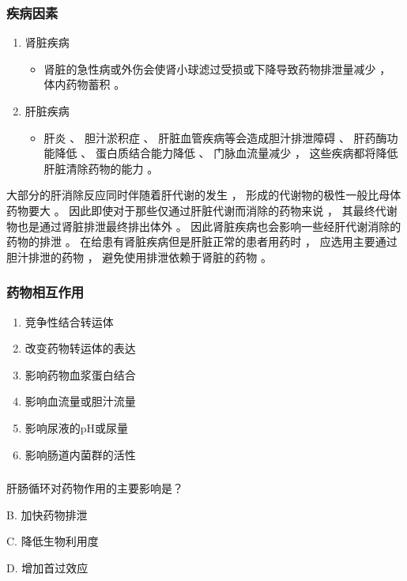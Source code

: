\documentclass[dvipsnames, svgnames, x11names]{beamer}
\begin{document}
\begin{frame}
    \frametitle{疾病因素}
    \begin{enumerate}
      \item 肾脏疾病
        \begin{itemize}
          \item 肾脏的急性病或外伤会使肾小球滤过受损或下降导致药物排泄量减少 ， 体内药物蓄积 。
        \end{itemize}
      \item 肝脏疾病
        \begin{itemize}
          \item 肝炎 、 胆汁淤积症 、 肝脏血管疾病等会造成胆汁排泄障碍 、 肝药酶功能降低 、 蛋白质结合能力降低 、 门脉血流量减少 ， 这些疾病都将降低肝脏清除药物的能力 。
        \end{itemize}
    \end{enumerate}
    \begin{blankblock}{}
        大部分的肝消除反应同时伴随着肝代谢的发生 ， 形成的代谢物的极性一般比母体药物要大 。 因此即使对于那些仅通过肝脏代谢而消除的药物来说 ， 其最终代谢物也是通过肾脏排泄最终排出体外 。 因此肾脏疾病也会影响一些经肝代谢消除的药物的排泄 。 在给患有肾脏疾病但是肝脏正常的患者用药时 ， 应选用主要通过胆汁排泄的药物 ， 避免使用排泄依赖于肾脏的药物 。
    \end{blankblock}
\end{frame}


\begin{frame}
    \frametitle{药物相互作用}
    \begin{enumerate}
      \item 竞争性结合转运体
      \item 改变药物转运体的表达
      \item 影响药物血浆蛋白结合
      \item 影响血流量或胆汁流量
      \item 影响尿液的pH或尿量
      \item 影响肠道内菌群的活性
    \end{enumerate}
\end{frame}


\begin{frame}[t]
    \frametitle{}
    \begin{question}
        肝肠循环对药物作用的主要影响是？
        \tcblower


        B. 加快药物排泄

        C. 降低生物利用度

        D. 增加首过效应
    \end{question}
\end{frame}
\end{document}
